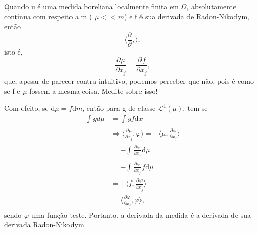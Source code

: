 \documentclass[../distribution_theory_notes.tex]{subfiles}
\begin{document}
\begin{tcolorbox}[
		skin=enhanced,
		title=Observação,
		fonttitle=\bfseries,
		colframe=black,
		colbacktitle=cyan!75!white,
		colback=cyan!15,
		colbacklower=black,
		coltitle=black,
		drop fuzzy shadow,
	]
	Quando u é uma medida boreliana localmente finita em \(\Omega \), absolutamente contínua com respeito a m ( \(\mu << m\)) e f é sua derivada de Radon-Nikodym, então
	\[
		\biggl\langle \frac{\partial^{}}{\partial ^{}},  \biggr\rangle,
	\]
	isto é,
	\[
		\frac{\partial^{}\mu }{\partial x_{j}^{}} = \frac{\partial^{}f}{\partial x_{j}^{}},
	\]
	que, apesar de parecer contra-intuitivo, podemos perceber que não, pois é como se f e \(\mu \) fossem a mesma coisa. Medite sobre isso!

	Com efeito, se \(\mathrm{d}\mu  = f \mathrm{d}m\), então para g de classe \(\mathcal{L}^{1}(\mu )\), tem-se
	\begin{align*}
		\int_{}g d\mu_{} & = \int_{}gf \mathrm{d}x                                                                                                                                                         \\
		                 & \Rightarrow \biggl\langle \frac{\partial^{}\mu }{\partial x_{j}^{}}, \varphi  \biggr\rangle = - \biggl\langle \mu , \frac{\partial^{}\varphi }{\partial x_{j}^{}} \biggr\rangle \\
		                 & = - \int_{}^{}\frac{\partial^{}\varphi }{\partial x_{j}^{}} \mathrm{d}\mu                                                                                                       \\
		                 & = - \int_{}\frac{\partial^{}\varphi }{\partial x_{j}^{}} f\mathrm{d}\mu_{}                                                                                                      \\
		                 & = - \biggl\langle f, \frac{\partial^{}\varphi }{\partial x_{j}^{}} \biggr\rangle                                                                                                \\
		                 & = \biggl\langle \frac{\partial^{}\varphi }{\partial x_{j}^{}},  \varphi \biggr\rangle,
	\end{align*}
	sendo \(\varphi \) uma função teste. Portanto, a derivada da medida é a derivada de sua derivada Radon-Nikodym.
\end{tcolorbox}
\end{document}
